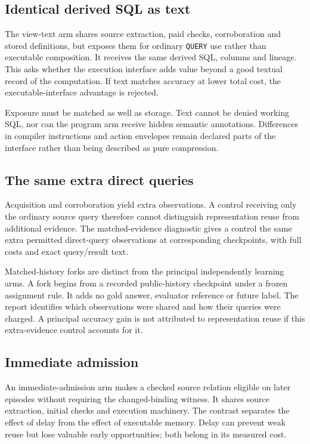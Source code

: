 \documentclass[10pt,twocolumn]{article}
\newcommand{\code}[1]{\texttt{\small #1}}
\begin{document}
\subsection{Identical derived SQL as text}
The view-text arm shares source extraction, paid checks, corroboration and
stored definitions, but exposes them for ordinary \code{QUERY} use rather than
executable composition. It receives the same derived SQL, columns and lineage.
This asks whether the execution interface adds value beyond a good textual
record of the computation. If text matches accuracy at lower total cost, the
executable-interface advantage is rejected.

Exposure must be matched as well as storage. Text cannot be denied working SQL,
nor can the program arm receive hidden semantic annotations. Differences in
compiler instructions and action envelopes remain declared parts of the
interface rather than being described as pure compression.

\subsection{The same extra direct queries}
Acquisition and corroboration yield extra observations. A control receiving
only the ordinary source query therefore cannot distinguish representation
reuse from additional evidence. The matched-evidence diagnostic gives a control
the same extra permitted direct-query observations at corresponding checkpoints,
with full costs and exact query/result text.

Matched-history forks are distinct from the principal independently learning
arms. A fork begins from a recorded public-history checkpoint under a frozen
assignment rule. It adds no gold answer, evaluator reference or future label.
The report identifies which observations were shared and how their queries
were charged. A principal accuracy gain is not attributed to representation
reuse if this extra-evidence control accounts for it.

\subsection{Immediate admission}
An immediate-admission arm makes a checked source relation eligible on later
episodes without requiring the changed-binding witness. It shares source
extraction, initial checks and execution machinery. The contrast separates the
effect of delay from the effect of executable memory. Delay can prevent weak
reuse but lose valuable early opportunities; both belong in its measured cost.
\end{document}
